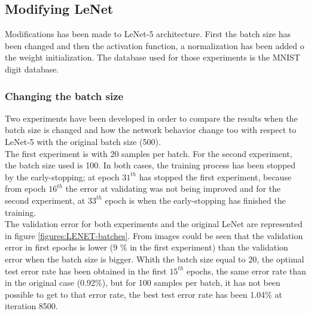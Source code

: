 


\subsection{Modifying LeNet}
Modifications has been made to LeNet-5 architecture. First the batch size has been changed and then the activation function, a normalization has been added o the weight initialization. The database used for those experiments is the MNIST digit database.\\

\subsubsection{Changing the batch size}
Two experiments have been developed in order to compare the results when the batch size is changed and how the network behavior change too with respect to LeNet-5 with the original batch size (500).\\

The first experiment is with 20 samples per batch. For the second experiment, the batch size used is 100. In both cases, the training process has been stopped by the early-stopping; at epoch $31^{th}$ has stopped the first experiment, because from epoch $16^{th}$ the error at validating was not being improved and for the second experiment, at $33^{th}$ epoch is when the early-stopping has finished the training.\\

The validation error for both experiments and the original LeNet are represented in figure \ref{figures:LENET-batches}. From images could be seen that the validation error in first epochs is lower (9 \% in the first experiment) than the validation error when the batch size is bigger. Whith the batch size equal to 20, the optimal test error rate has been obtained in the first $15^{th}$ epochs, the same error rate than in the original case (0.92\%), but for 100 samples per batch, it has not been possible to get to that error rate, the best test error rate has been 1.04\% at iteration 8500.\\

